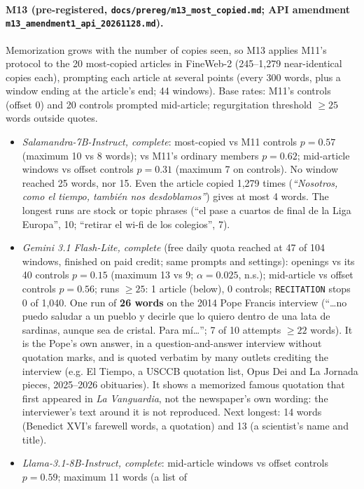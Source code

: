 \documentclass[10pt,a4paper]{article}
\begin{document}
\paragraph{M13 (pre-registered, \texttt{docs/prereg/m13\_most\_copied.md}; API amendment
\texttt{m13\_amendment1\_api\_20261128.md}).} Memorization grows with the number of copies seen, so M13 applies M11's
protocol to the 20 most-copied articles in FineWeb-2 (245--1,279 near-identical copies each), prompting each article at
several points (every 300 words, plus a window ending at the article's end; 44 windows). Base rates: M11's controls
(offset 0) and 20 controls prompted mid-article; regurgitation threshold $\geq 25$ words outside quotes.
\begin{itemize}
\item \emph{Salamandra-7B-Instruct, complete}: most-copied vs M11 controls $p=0.57$ (maximum 10 vs 8 words);
vs M11's ordinary members $p=0.62$; mid-article windows vs offset controls $p=0.31$ (maximum 7 on controls). No
window reached 25 words, nor 15. Even the article copied 1,279 times (\emph{``Nosotros, como el tiempo, también nos
desdoblamos''}) gives at most 4 words. The longest runs are stock or topic phrases (``el pase a cuartos de final de
la Liga Europa'', 10; ``retirar el wi-fi de los colegios'', 7).
\item \emph{Gemini 3.1 Flash-Lite, complete} (free daily quota reached at 47 of 104 windows, finished on paid credit;
same prompts and settings): openings vs its 40 controls $p=0.15$ (maximum 13 vs 9; $\alpha=0.025$, n.s.); mid-article vs
offset controls $p=0.56$; runs $\geq 25$: 1 article (below), 0 controls; \texttt{RECITATION} stops 0 of 1,040. One run of \textbf{26 words} on the 2014 Pope Francis interview
(``\ldots no puedo saludar a un pueblo y decirle que lo quiero dentro de una lata de sardinas, aunque sea de
cristal. Para mí\ldots''; 7 of 10 attempts $\geq 22$ words). It is the Pope's own answer, in a question-and-answer
interview without quotation marks, and is quoted verbatim by many outlets crediting the interview (e.g. El Tiempo,
a USCCB quotation list, Opus Dei and La Jornada pieces, 2025--2026 obituaries). It shows a memorized famous
quotation that first appeared in \emph{La Vanguardia}, not the newspaper's own wording: the interviewer's text around
it is not reproduced. Next longest: 14 words (Benedict XVI's farewell words, a quotation) and 13 (a scientist's name and
title).
\item \emph{Llama-3.1-8B-Instruct, complete}: mid-article windows vs offset controls $p=0.59$; maximum 11 words (a list of

\end{itemize}
\end{document}
